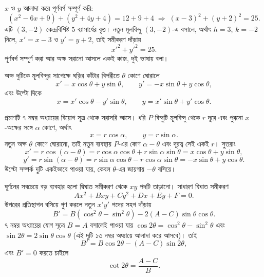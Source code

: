 \documentclass[11pt]{article}
\begin{document}
\begin{solbox}
$x$ ও $y$ আলাদা করে পূর্ণবর্গ সম্পূর্ণ করি:
\[
  (x^{2}-6x+9) + (y^{2}+4y+4) = 12 + 9 + 4
  \;\Longrightarrow\; (x-3)^{2} + (y+2)^{2} = 25 .
\]
এটি $(3,-2)$ কেন্দ্রবিশিষ্ট $5$ ব্যাসার্ধের বৃত্ত। নতুন মূলবিন্দু $(3,-2)$-এ
বসালে, অর্থাৎ $h = 3$, $k = -2$ নিলে, $x' = x-3$ ও $y' = y+2$, তাই সমীকরণ
দাঁড়ায়
\[
  x'^{2} + y'^{2} = 25 .
\]
পূর্ণবর্গ সম্পূর্ণ করা আর অক্ষ সরানো আসলে একই কাজ, দুই ভাষায় বলা।
\end{solbox}

\begin{idea}[অক্ষের ঘূর্ণন]
অক্ষ দুটিকে মূলবিন্দুর সাপেক্ষে ঘড়ির কাঁটার বিপরীতে $\theta$ কোণে ঘোরালে
\[
  x' = x\cos\theta + y\sin\theta, \qquad
  y' = -x\sin\theta + y\cos\theta ,
\]
এবং উল্টো দিকে
\[
  x = x'\cos\theta - y'\sin\theta, \qquad
  y = x'\sin\theta + y'\cos\theta .
\]
\end{idea}

\begin{center}
\end{center}

প্রমাণটি ৭ নম্বর অধ্যায়ের বিয়োগ সূত্র থেকে সরাসরি আসে। ধরি $P$ বিন্দুটি
মূলবিন্দু থেকে $r$ দূরে এবং পুরনো $x$-অক্ষের সঙ্গে $\alpha$ কোণে, অর্থাৎ
\[
  x = r\cos\alpha, \qquad y = r\sin\alpha .
\]
নতুন অক্ষ $\theta$ কোণে ঘোরানো, তাই নতুন ব্যবস্থায় $P$-এর কোণ $\alpha - \theta$
এবং দূরত্ব সেই একই $r$। সুতরাং
\[
  x' = r\cos(\alpha-\theta) = r\cos\alpha\cos\theta + r\sin\alpha\sin\theta
     = x\cos\theta + y\sin\theta ,
\]
\[
  y' = r\sin(\alpha-\theta) = r\sin\alpha\cos\theta - r\cos\alpha\sin\theta
     = -x\sin\theta + y\cos\theta .
\]
উল্টো সম্পর্ক দুটি একইভাবে পাওয়া যায়, কেবল $\theta$-এর জায়গায় $-\theta$ বসিয়ে।

ঘূর্ণনের সবচেয়ে বড় ব্যবহার হলো দ্বিঘাত সমীকরণ থেকে $xy$ পদটি তাড়ানো। সাধারণ
দ্বিঘাত সমীকরণ
\[
  Ax^{2} + Bxy + Cy^{2} + Dx + Ey + F = 0 .
\]
উপরের প্রতিস্থাপন বসিয়ে গুণ করলে নতুন $x'y'$ পদের সহগ দাঁড়ায়
\[
  B' = B\left( \cos^{2}\theta - \sin^{2}\theta \right)
     - 2(A-C)\sin\theta\cos\theta .
\]
৭ নম্বর অধ্যায়ের যোগ সূত্রে $B = A$ বসালেই পাওয়া যায়
$\cos 2\theta = \cos^{2}\theta - \sin^{2}\theta$ এবং
$\sin 2\theta = 2\sin\theta\cos\theta$ (এই দুটি ১৩ নম্বর অধ্যায়ে আলাদা করে
আসবে)। তাই
\[
  B' = B\cos 2\theta - (A-C)\sin 2\theta ,
\]
এবং $B' = 0$ করতে চাইলে
\[
  \cot 2\theta = \frac{A-C}{B} .
\]
\end{document}
